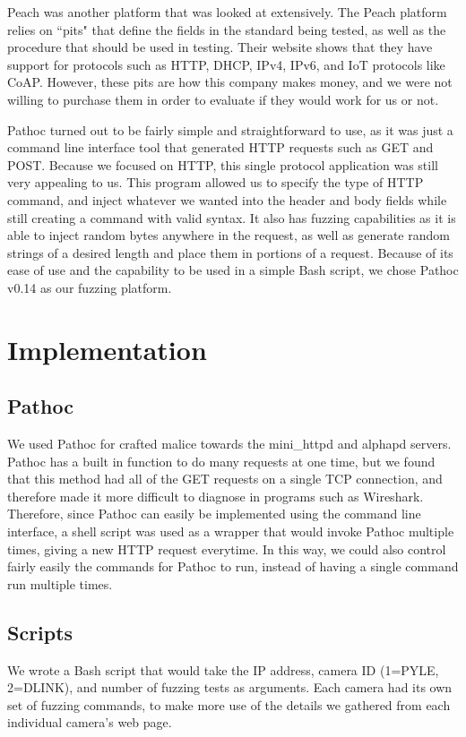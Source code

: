 \documentclass[letterpaper,twocolumn,10pt]{article}
\begin{document}
Peach was another platform that was looked at extensively. The Peach platform relies on ``pits" that define the fields in the standard being tested, as well as the procedure that should be used in testing. Their website shows that they have support for protocols such as HTTP, DHCP, IPv4, IPv6, and IoT protocols like CoAP. However, these pits are how this company makes money, and we were not willing to purchase them in order to evaluate if they would work for us or not.

Pathoc turned out to be fairly simple and straightforward to use, as it was just a command line interface tool that generated HTTP requests such as GET and POST. Because we focused on HTTP, this single protocol application was still very appealing to us. This program allowed us to specify the type of HTTP command, and inject whatever we wanted into the header and body fields while still creating a command with valid syntax. It also has fuzzing capabilities as it is able to inject random bytes anywhere in the request, as well as generate random strings of a desired length and place them in portions of a request. Because of its ease of use and the capability to be used in a simple Bash script, we chose Pathoc v0.14 as our fuzzing platform.


\section{Implementation}

\subsection{Pathoc}
We used Pathoc for crafted malice towards the mini\_httpd and alphapd servers. Pathoc has a built in function to do many requests at one time, but we found that this method had all of the GET requests on a single TCP connection, and therefore made it more difficult to diagnose in programs such as Wireshark. Therefore, since Pathoc can easily be implemented using the command line interface, a shell script was used as a wrapper that would invoke Pathoc multiple times, giving a new HTTP request everytime. In this way, we could also control fairly easily the commands for Pathoc to run, instead of having a single command run multiple times.



\subsection{Scripts}
We wrote a Bash script that would take the IP address, camera ID (1=PYLE, 2=DLINK), and number of fuzzing tests as arguments. Each camera had its own set of fuzzing commands, to make more use of the details we gathered from each individual camera's web page.
\end{document}
